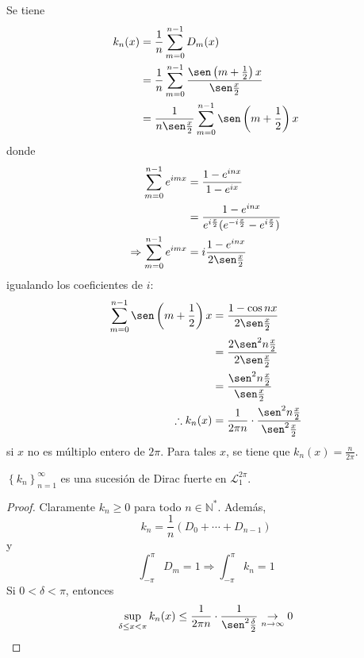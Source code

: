 \documentclass[12pt]{report}
\theoremstyle{largebreak}
\begin{document}
    Se tiene
    \begin{equation*}
        \begin{split}
            k_n(x)&=\frac{1}{n}\sum_{ m=0}^{ n-1}D_m(x)\\
            &=\frac{1}{n}\sum_{ m=0}^{ n-1}\frac{\sen\left(m+\frac{1}{2} \right)x}{\sen\frac{x}{2}}\\
            &=\frac{1}{n\sen\frac{x}{2}}\sum_{ m=0}^{ n-1}\sen\left(m+\frac{1}{2} \right)x\\
        \end{split}
    \end{equation*}
    donde
    \begin{equation*}
        \begin{split}
            \sum_{ m=0}^{ n-1}e^{ imx}&=\frac{1-e^{ inx}}{1-e^{ ix}}\\
            &=\frac{1-e^{ inx}}{e^{ i\frac{x}{2}}(e^{ -i\frac{x}{2}}-e^{ i\frac{x}{2}})}\\
            \Rightarrow \sum_{ m=0}^{ n-1}e^{ imx}&=i\frac{1-e^{ inx}}{2\sen\frac{x}{2}}\\
        \end{split}
    \end{equation*}
    igualando los coeficientes de $i$:
    \begin{equation*}
        \begin{split}
            \sum_{ m=0}^{ n-1}\sen\left(m+\frac{1}{2} \right)x&=\frac{1-\cos nx}{2\sen\frac{x}{2}}\\
            &=\frac{2\sen^2 n\frac{x}{2}}{2\sen\frac{x}{2}}\\
            &=\frac{\sen^2 n\frac{x}{2}}{\sen\frac{x}{2}}\\
            \therefore k_n(x)&=\frac{1}{2\pi n}\cdot\frac{\sen^2 n\frac{x}{2}}{\sen^2\frac{x}{2}}\\
        \end{split}
    \end{equation*}
    si $x$ no es múltiplo entero de $2\pi$. Para tales $x$, se tiene que $k_n(x)=\frac{n}{2\pi}$.

    \begin{propo}
        $\left\{k_n \right\}_{ n=1}^\infty$ es una sucesión de Dirac fuerte en $\mathcal{L}_1^{2\pi}$.
    \end{propo}

    \begin{proof}
        Claramente $k_n\geq 0$ para todo $n\in\mathbb{N}^*$. Además,
        \begin{equation*}
            k_n=\frac{1}{n}\left(D_0+\cdots+D_{ n-1} \right)
        \end{equation*}
        y
        \begin{equation*}
            \int_{ -\pi}^{\pi}D_m=1\Rightarrow \int_{ -\pi}^{ \pi}k_n=1
        \end{equation*}
        Si $0<\delta<\pi$, entonces
        \begin{equation*}
            \sup_{ \delta\leq x<\pi}k_n(x)\leq\frac{1}{2\pi n}\cdot\frac{1}{\sen^2\frac{\delta}{2}}\underset{n\rightarrow\infty}{\rightarrow}0
        \end{equation*}
    \end{proof}
\end{document}
